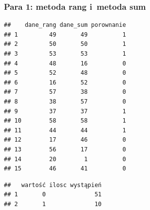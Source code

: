 \documentclass[12pt,a4paper]{report}
\begin{document}
{\subsubsection{Para 1: metoda rang i~metoda
sum}%
\begin{Shaded}
\begin{Highlighting}[]
\NormalTok{(}\NormalTok{,}\NormalTok{)}
\NormalTok{:}
\NormalTok{\{}
  \NormalTok{\{}
  \NormalTok{\}}
\NormalTok{\}}
\NormalTok{)}
\end{Highlighting}
\end{Shaded}
\begin{verbatim}
##    dane_rang dane_sum porownanie
## 1         49       49          1
## 2         50       50          1
## 3         53       53          1
## 4         48       16          0
## 5         52       48          0
## 6         16       52          0
## 7         57       38          0
## 8         38       57          0
## 9         37       37          1
## 10        58       58          1
## 11        44       44          1
## 12        17       46          0
## 13        56       17          0
## 14        20        1          0
## 15        46       41          0
\end{verbatim}
\begin{Shaded}
\begin{Highlighting}[]
\NormalTok{(}
\NormalTok{(}\NormalTok{,}\NormalTok{)}
\end{Highlighting}
\end{Shaded}
\begin{verbatim}
##   wartość ilosc wystąpień
## 1       0              51
## 2       1              10
\end{verbatim}
}
\end{document}
